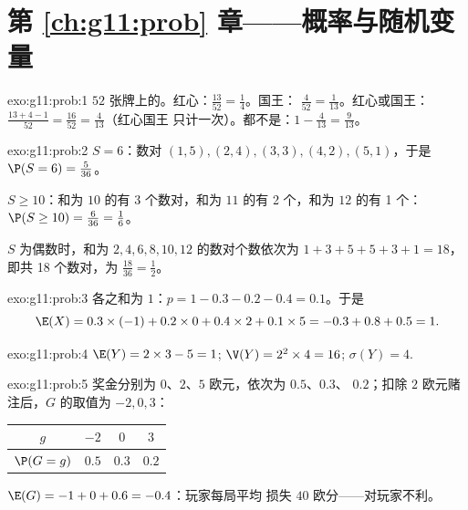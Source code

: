 \section*{第 \ref{ch:g11:prob} 章——概率与随机变量}

\begin{solution}{exo:g11:prob:1}
$52$ 张牌上的。红心：$\frac{13}{52} = \frac14$。国王：
$\frac{4}{52} = \frac{1}{13}$。红心或国王：
$\frac{13 + 4 - 1}{52} = \frac{16}{52} = \frac{4}{13}$（红心国王
只计一次）。都不是：$1 - \frac{4}{13} = \frac{9}{13}$。
\end{solution}

\begin{solution}{exo:g11:prob:2}
$S = 6$：数对 $(1,5), (2,4), (3,3), (4,2), (5,1)$，于是
$\P(S = 6) = \frac{5}{36}$。

$S \geq 10$：和为 $10$ 的有 3 个数对，和为 $11$ 的有 2 个，和为 $12$ 的有 1 个：
$\P(S \geq 10) = \frac{6}{36} = \frac16$。

$S$ 为偶数时，和为 $2, 4, 6, 8, 10, 12$ 的数对个数依次为 $1 + 3 + 5 + 5 + 3 + 1 = 18$，
即共 18 个数对，为 $\frac{18}{36} = \frac12$。
\end{solution}

\begin{solution}{exo:g11:prob:3}
各之和为 $1$：$p = 1 - 0.3 - 0.2 - 0.4 = 0.1$。于是
\[
\E(X) = 0.3 \times (-1) + 0.2 \times 0 + 0.4 \times 2 + 0.1 \times 5
= -0.3 + 0.8 + 0.5 = 1 .
\]
\end{solution}

\begin{solution}{exo:g11:prob:4}
$\E(Y) = 2 \times 3 - 5 = 1$; $\V(Y) = 2^2 \times 4 = 16$;
$\sigma(Y) = 4$.
\end{solution}

\begin{solution}{exo:g11:prob:5}
奖金分别为 $0$、$2$、$5$ 欧元，依次为 $0.5$、$0.3$、
$0.2$；扣除 $2$ 欧元赌注后，$G$ 的取值为 $-2, 0, 3$：
\begin{center}
\begin{tabular}{c|ccc}
$g$ & $-2$ & $0$ & $3$\\
\hline
$\P(G=g)$ & $0.5$ & $0.3$ & $0.2$
\end{tabular}
\end{center}
$\E(G) = -1 + 0 + 0.6 = -0.4$：玩家每局平均
损失 $40$ 欧分——对玩家不利。
\end{solution}


